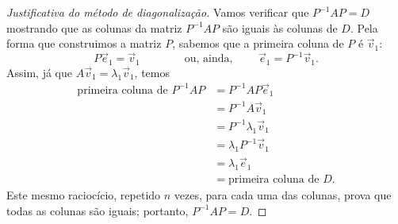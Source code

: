 \documentclass[../livro.tex]{subfiles}  %
\begin{document}
\begin{proof}[Justificativa do método de diagonalização]
Vamos verificar que $P^{-1} A P = D$ mostrando que as colunas da matriz $P^{-1} A P$ são iguais às colunas de $D$. Pela forma que construimos a matriz $P$, sabemos que a primeira coluna de $P$ é $\vec{v}_1$:
\begin{equation}
P \vec{e}_1 = \vec{v}_1 \qquad \qquad \text{ou, ainda, } \qquad  \vec{e}_1 = P^{-1} \vec{v}_1.
\end{equation} Assim, já que $A \vec{v}_1 = \lambda_1 \vec{v}_1$, temos
\begin{equation}
\begin{split}
\text{primeira coluna de } P^{-1} A P  & = P^{-1} A P \vec{e}_1 \\
                                       & = P^{-1} A \vec{v}_1 \\
                                       & = P^{-1} \lambda_1 \vec{v}_1 \\
                                       & = \lambda_1 P^{-1} \vec{v}_1 \\
                                       & = \lambda_1 \vec{e}_1 \\
                                       & = \text{primeira coluna de } D.
\end{split}
\end{equation}
Este mesmo raciocício, repetido $n$ vezes, para cada uma das colunas, prova que todas as colunas são iguais; portanto, $P^{-1} A P = D$.
\end{proof}
\end{document}
